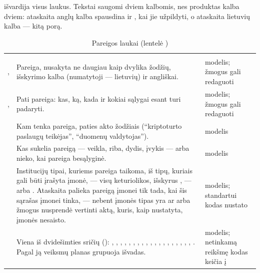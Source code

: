 išvardija visus laukus. Tekstai saugomi dviem kalbomis, nes
produktas kalba dviem: ataskaita anglų kalba spausdina  ir , kai
jie užpildyti, o ataskaita lietuvių kalba --- kitą porą.

\begin{xltabular}{\textwidth}{@{}L{31mm}YL{27mm}@{}}
\caption{Pareigos laukai (lentelė )}\label{tab:obligations:fields}\\
\toprule
{} &  &  \\
\midrule
\endfirsthead
\toprule
{} &  &  \\
\midrule
\endhead
\bottomrule
\endlastfoot
{},  & Pareiga, nusakyta ne daugiau kaip dvylika žodžių, išskyrimo kalba (numatytoji --- lietuvių) ir angliškai. & modelis; žmogus gali redaguoti \\
,  & Pati pareiga: kas, ką, kada ir kokiai sąlygai esant turi padaryti. & modelis; žmogus gali redaguoti \\
 & Kam tenka pareiga, paties akto žodžiais (\enquote{kriptoturto paslaugų teikėjas}, \enquote{duomenų valdytojas}). & modelis \\
 & Kas sukelia pareigą --- veikla, riba, dydis, įvykis --- arba nieko, kai pareiga besąlyginė. & modelis \\
 & Institucijų tipai, kuriems pareiga taikoma, iš tipų, kuriais gali būti įrašyta įmonė, --- visų keturiolikos, išskyrus , --- arba . Ataskaita palieka pareigą įmonei tik tada, kai šis sąrašas įmonei tinka, --- nebent įmonės tipas yra  ar  arba žmogus nusprendė vertinti aktą, kuris, kaip nustatyta, įmonės nesaisto. & modelis; standartui kodas nustato  \\
 & Viena iš dvidešimties sričių (): , , , , , , , , , , , , , , , , , , , . Pagal ją veiksmų planas grupuoja išvadas. & modelis; netinkamą reikšmę kodas keičia į  \\

\end{xltabular}
